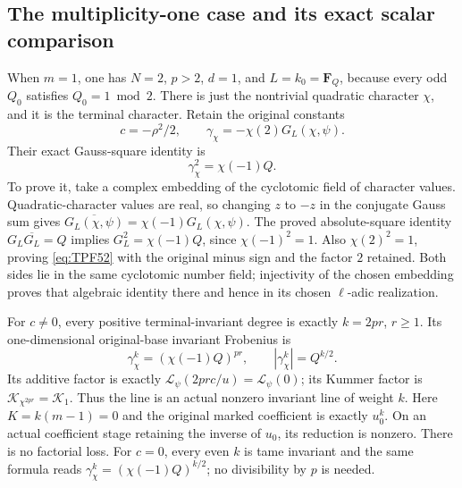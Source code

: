 \subsection{The multiplicity-one case and its exact scalar comparison}

When \(m=1\), one has \(N=2\), \(p>2\),
\(d=1\), and \(L=k_0=\mathbf F_Q\), because
every odd \(Q_0\) satisfies \(Q_0=1\bmod2\).
There is just the nontrivial quadratic
character \(\chi\), and it is the terminal
character. Retain the original constants
\[
 c=-\rho^2/2,\qquad
 \gamma_\chi=-\chi(2)G_L(\chi,\psi).
 \tag{TPF.51}\label{eq:TPF51}
\]
Their exact Gauss-square identity is
\[
 \gamma_\chi^2=\chi(-1)Q.
 \tag{TPF.52}\label{eq:TPF52}
\]
To prove it, take a complex embedding of the
cyclotomic field of character values.
Quadratic-character values are real, so
changing \(z\) to \(-z\) in the conjugate
Gauss sum gives
\(\overline{G_L(\chi,\psi)}
 =\chi(-1)G_L(\chi,\psi)\).
The proved absolute-square identity
\(G_L\overline{G_L}=Q\) implies
\(G_L^2=\chi(-1)Q\), since \(\chi(-1)^2=1\).
Also \(\chi(2)^2=1\), proving
\eqref{eq:TPF52} with the original minus
sign and the factor \(2\) retained.
Both sides lie in the same cyclotomic
number field; injectivity of the chosen
embedding proves that algebraic identity
there and hence in its chosen \(\ell\)-adic
realization.

For \(c\ne0\), every positive terminal-invariant
degree is exactly \(k=2pr\), \(r\ge1\).
Its one-dimensional original-base invariant
Frobenius is
\[
 \gamma_\chi^k
      =(\chi(-1)Q)^{pr},\qquad
 |\gamma_\chi^k|=Q^{k/2}.
 \tag{TPF.53}\label{eq:TPF53}
\]
Its additive factor is exactly
\(\mathcal L_\psi(2prc/u)=\mathcal L_\psi(0)\);
its Kummer factor is
\(\mathcal K_{\chi^{2pr}}=\mathcal K_1\).
Thus the line is an actual nonzero invariant
line of weight \(k\).
Here \(K=k(m-1)=0\) and the original marked
coefficient is exactly \(u_0^k\).
On an actual coefficient stage retaining
the inverse of \(u_0\), its reduction is
nonzero. There is no factorial loss.
For \(c=0\), every even \(k\) is tame
invariant and the same formula reads
\(\gamma_\chi^k=(\chi(-1)Q)^{k/2}\);
no divisibility by \(p\) is needed.

